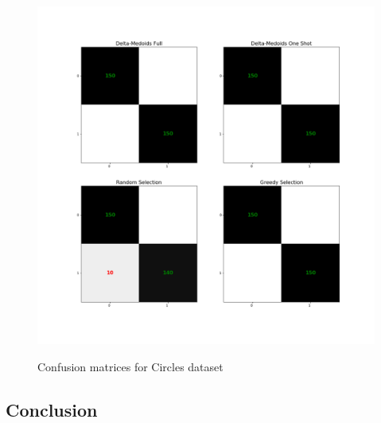 \documentclass[thesis=B,english]{FITthesis}[2012/10/20]
\begin{document}
\begin{figure}
   \includegraphics[width=\linewidth]{img/exp2_circles.png}
  \label{img:exp2_circles}
  \caption{Confusion matrices for Circles dataset}
\end{figure}


\subsection{Conclusion}
\end{document}
